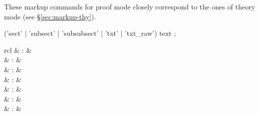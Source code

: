 \begin{isabellebody}
\begin{isamarkuptext}
  These markup commands for proof mode closely correspond to the ones
  of theory mode (see \S\ref{sec:markup-thy}).

  \begin{rail}
    ('sect' | 'subsect' | 'subsubsect' | 'txt' | 'txt\_raw') text
    ;
  \end{rail}%
\end{isamarkuptext}%
\isamarkuptrue%
%
\isamarkuptrue%
%
\isamarkuptrue%
%
\begin{isamarkuptext}%
\begin{matharray}{rcl}
    \hypertarget{command.pr}{\hyperlink{command.pr}{\mbox{}}}\isa{{\isachardoublequote}\isactrlsup {\isacharasterisk}{\isachardoublequote}} & : & \isarkeep{\cdot} \\
    \hypertarget{command.thm}{\hyperlink{command.thm}{\mbox{}}}\isa{{\isachardoublequote}\isactrlsup {\isacharasterisk}{\isachardoublequote}} & : &  \\
    \hypertarget{command.term}{\hyperlink{command.term}{\mbox{}}}\isa{{\isachardoublequote}\isactrlsup {\isacharasterisk}{\isachardoublequote}} & : &  \\
    \hypertarget{command.prop}{\hyperlink{command.prop}{\mbox{}}}\isa{{\isachardoublequote}\isactrlsup {\isacharasterisk}{\isachardoublequote}} & : &  \\
    \hypertarget{command.typ}{\hyperlink{command.typ}{\mbox{}}}\isa{{\isachardoublequote}\isactrlsup {\isacharasterisk}{\isachardoublequote}} & : &  \\
    \hypertarget{command.prf}{\hyperlink{command.prf}{\mbox{}}}\isa{{\isachardoublequote}\isactrlsup {\isacharasterisk}{\isachardoublequote}} & : &  \\
    \hypertarget{command.full-prf}{\hyperlink{command.full-prf}{\mbox{}}}\isa{{\isachardoublequote}\isactrlsup {\isacharasterisk}{\isachardoublequote}} & : &  \\
  \end{matharray}


\end{isamarkuptext}
\end{isabellebody}
